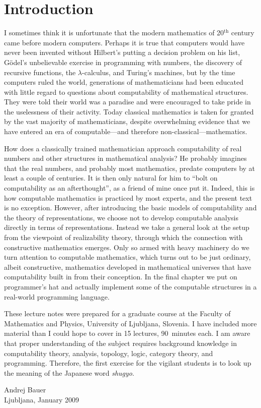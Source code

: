 \chapter{Introduction\label{cha:introduction}}


I sometimes think it is unfortunate that the modern mathematics of
20${}^{\text{th}}$ century came before modern computers. Perhaps it is
true that computers would have never been invented without Hilbert's
putting a decision problem on his list, G\"odel's unbelievable
exercise in programming with numbers, the discovery of recursive
functions, the $\lambda$-calculus, and Turing's machines, but by the
time computers ruled the world, generations of mathematicians had been
educated with little regard to questions about computability of
mathematical structures. They were told their world was a paradise and
were encouraged to take pride in the uselessness of their activity.
Today classical mathematics is taken for granted by the vast majority
of mathematicians, despite overwhelming evidence that we have entered
an era of computable---and therefore non-classical---mathematics.

How does a classically trained mathematician approach computability of
real numbers and other structures in mathematical analysis? He
probably imagines that the real numbers, and probably most
mathematics, predate computers by at least a couple of centuries. It
is then only natural for him to ``bolt on computability as an
afterthought'', as a friend of mine once put it. Indeed, this is how
computable mathematics is practiced by most experts, and the present
text is no exception. However, after introducing the basic models of
computability and the theory of representations, we choose not to
develop computable analysis directly in terms of representations.
Instead we take a general look at the setup from the viewpoint of
realizability theory, through which the connection with constructive
mathematics emerges. Only so armed with heavy machinery do we turn
attention to computable mathematics, which turns out to be just
ordinary, albeit constructive, mathematics developed in mathematical
universes that have computability built in from their conception. In
the final chapter we put on programmer's hat and actually implement
some of the computable structures in a real-world programming
language.

These lecture notes were prepared for a graduate course at the Faculty
of Mathematics and Physics, University of Ljubljana, Slovenia. I have
included more material than I could hope to cover in 15 lectures,
90~minutes each. I am aware that proper understanding of the subject
requires background knowledge in computability theory, analysis,
topology, logic, category theory, and programming. Therefore, the
first exercise for the vigilant students is to look up the meaning of
the Japanese word \emph{shugyo}.


\bigskip

\begin{flushright}
Andrej Bauer\\
Ljubljana, January 2009
\end{flushright}


